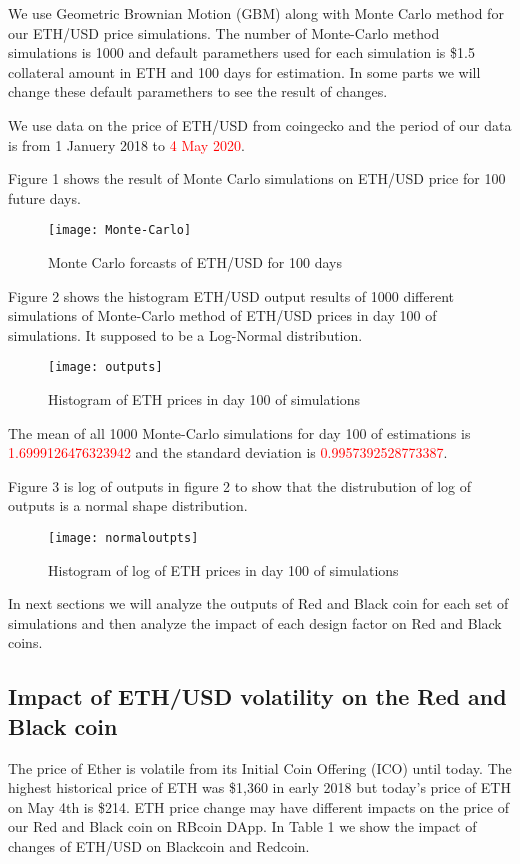 We use Geometric Brownian Motion (GBM) along with Monte Carlo method for our ETH/USD price simulations. The number of Monte-Carlo method simulations is 1000 and default paramethers used for each simulation is \$1.5 collateral amount in ETH and 100 days for estimation. In some parts we will change these default paramethers to see the result of changes.

We use data on the price of ETH/USD from coingecko and the period of our data is from 1 Januery 2018 to \textcolor{red}{4 May 2020}.

Figure 1 shows the result of Monte Carlo simulations on ETH/USD price for 100 future days.
\begin{figure}[t]
\centering
\texttt{[image: Monte-Carlo]}
\caption{Monte Carlo forcasts of ETH/USD for 100 days}
\end{figure}
Figure 2 shows the histogram ETH/USD output results of 1000 different simulations of Monte-Carlo method of ETH/USD prices in day 100 of simulations. It supposed to be a Log-Normal distribution.
\begin{figure}[t]
\centering
\texttt{[image: outputs]}
\caption{Histogram of ETH prices in day 100 of simulations}
\end{figure}

The mean of all 1000 Monte-Carlo simulations for day 100 of estimations is \textcolor{red}{1.6999126476323942} and the standard deviation is \textcolor{red}{0.9957392528773387}.

Figure 3 is log of outputs in figure 2 to show that the distrubution of log of outputs is a normal shape distribution.

\begin{figure}[t]
\centering
\texttt{[image: normaloutpts]}
\caption{Histogram of log of ETH prices in day 100 of simulations}
\end{figure}


In next sections we will analyze the outputs of Red and Black coin for each set of simulations and then analyze the impact of each design factor on Red and Black coins.

\subsection{Impact of ETH/USD volatility on the Red and Black coin}

The price of Ether is volatile from its Initial Coin Offering (ICO) until today. The highest historical price of ETH was \$1,360 in early 2018 but today's price of ETH on May 4th is \$214. 
ETH price change may have different impacts on the price of our Red and Black coin on RBcoin DApp. In Table 1 we show the impact of changes of ETH/USD on Blackcoin and Redcoin.



